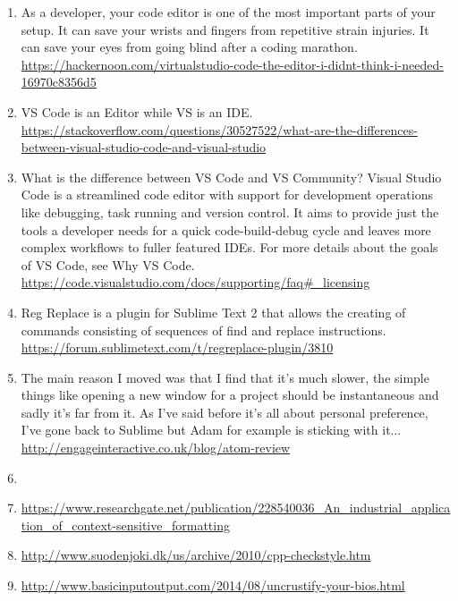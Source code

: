 \begin{sloppypar}
\begin{bluebox}
\begin{enumerate}[leftmargin=*,parsep=0pt]
    \item As a developer, your code editor is one of the most important parts of
    your setup. It can save your wrists and fingers from repetitive strain
    injuries. It can save your eyes from going blind after a coding marathon.
    \url{https://hackernoon.com/virtualstudio-code-the-editor-i-didnt-think-i-needed-16970c8356d5}

    \item VS Code is an Editor while VS is an IDE.
    \url{https://stackoverflow.com/questions/30527522/what-are-the-differences-between-visual-studio-code-and-visual-studio}

    \item What is the difference between VS Code and VS Community?
    Visual Studio Code is a streamlined code editor with support for development operations like
    debugging, task running and version control. It aims to provide just the tools a developer needs
    for a quick code-build-debug cycle and leaves more complex workflows to fuller featured IDEs.
    For more details about the goals of VS Code, see Why VS Code.
    \url{https://code.visualstudio.com/docs/supporting/faq#_licensing}

    \item Reg Replace is a plugin for Sublime Text 2 that allows the creating of commands consisting of
    sequences of find and replace instructions.
    \url{https://forum.sublimetext.com/t/regreplace-plugin/3810}

    \item The main reason I moved was that I find that it’s much slower, the simple things like opening a
    new window for a project should be instantaneous and sadly it’s far from it. As I've said before
    it's all about personal preference, I've gone back to Sublime but Adam for example is sticking
    with it...
    \url{http://engageinteractive.co.uk/blog/atom-review}

    \item {}

    \item \url{https://www.researchgate.net/publication/228540036_An_industrial_application_of_context-sensitive_formatting}

    \item \url{http://www.suodenjoki.dk/us/archive/2010/cpp-checkstyle.htm}

    \item \url{http://www.basicinputoutput.com/2014/08/uncrustify-your-bios.html}


\end{enumerate}
\end{bluebox}
\end{sloppypar}
